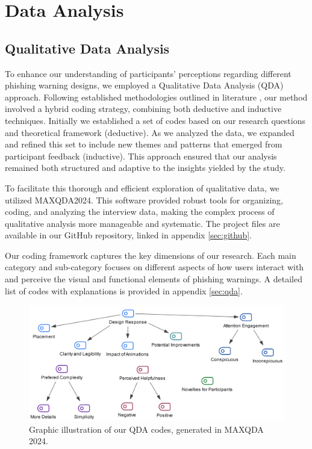 \documentclass[
  a4paper,  %
  twoside,  %
  bibliography=totoc,
  headsepline,
  cleardoublepage=empty,
  parskip=half,
  draft=false
]{scrbook}
\begin{document}
\section{Data Analysis}
\subsection{Qualitative Data Analysis}
To enhance our understanding of participants' perceptions regarding different phishing warning designs, we employed a Qualitative Data Analysis (QDA) approach. Following established methodologies outlined in literature \cite{qda}, our method involved a hybrid coding strategy, combining both deductive and inductive techniques. Initially we established a set of codes based on our research questions and theoretical framework (deductive). As we analyzed the data, we expanded and refined this set to include new themes and patterns that emerged from participant feedback (inductive). This approach ensured that our analysis remained both structured and adaptive to the insights yielded by the study.

To facilitate this thorough and efficient exploration of qualitative data, we utilized MAXQDA2024. This software provided robust tools for organizing, coding, and analyzing the interview data, making the complex process of qualitative analysis more manageable and systematic. The project files are available in our GitHub repository, linked in appendix \ref{sec:github}.

Our coding framework captures the key dimensions of our research. Each main category and sub-category focuses on different aspects of how users interact with and perceive the visual and functional elements of phishing warnings. A detailed list of codes with explanations is provided in appendix \ref{sec:qda}. 

\begin{figure} [ht]
    \centering
    \includegraphics[width=0.9\linewidth]{figures/coding.png}
    \caption{Graphic illustration of our QDA codes, generated in MAXQDA 2024.}
    \label{fig:qda}
\end{figure}
\end{document}
